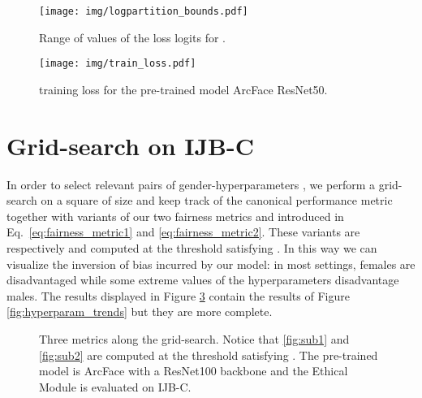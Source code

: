 \documentclass[nohyperref]{article}
\theoremstyle{plain}
\theoremstyle{definition}
\theoremstyle{remark}
\begin{document}
\begin{figure}[ht!]
    \centering
    \texttt{[image: img/logpartition\_bounds.pdf]}
    \caption{Range of values of the  loss logits for .}
    \label{fig:vMF_logpartition_bounds}
\end{figure}

\begin{figure}[ht!]
    \centering
    \texttt{[image: img/train\_loss.pdf]}
    \caption{ training loss for the pre-trained model ArcFace ResNet50.}
    \label{fig:train_loss}
\end{figure}



\section{Grid-search on IJB-C}\label{app:grid_search_2d}

In order to select relevant pairs of gender-hyperparameters , we perform a grid-search on a square of size  and keep track of the canonical performance metric  together with variants of our two fairness metrics  and  introduced in Eq.~\ref{eq:fairness_metric1} and \ref{eq:fairness_metric2}. These variants are respectively  and  computed at the threshold  satisfying . In this way we can visualize the inversion of bias incurred by our model: in most settings, females are disadvantaged while some extreme values of the hyperparameters disadvantage males. The results displayed in Figure \ref{fig:grid_search} contain the results of Figure \ref{fig:hyperparam_trends} but they are more complete.

\begin{figure}[ht!]
    \centering
\caption{Three metrics along the grid-search. Notice that \ref{fig:sub1} and \ref{fig:sub2} are computed at the threshold  satisfying . The pre-trained model is ArcFace with a ResNet100 backbone and the Ethical Module is evaluated on IJB-C.}
\label{fig:grid_search}
\end{figure}
\end{document}
